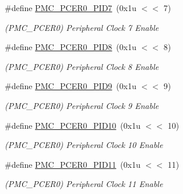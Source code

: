 \begin{DoxyCompactItemize}
\mbox{\label{group__SAMV71__PMC_ga65f9177c03d2f671c8eb80a60592defb}} 
\#define \mbox{\hyperlink{group__SAMV71__PMC_ga65f9177c03d2f671c8eb80a60592defb}{P\+M\+C\+\_\+\+P\+C\+E\+R0\+\_\+\+P\+I\+D7}}~(0x1u $<$$<$ 7)
\begin{DoxyCompactList}\small\item\em (P\+M\+C\+\_\+\+P\+C\+E\+R0) Peripheral Clock 7 Enable \end{DoxyCompactList}\item 
\mbox{\label{group__SAMV71__PMC_ga7cf79cd20d5b5286d828f43bbea5bdb6}} 
\#define \mbox{\hyperlink{group__SAMV71__PMC_ga7cf79cd20d5b5286d828f43bbea5bdb6}{P\+M\+C\+\_\+\+P\+C\+E\+R0\+\_\+\+P\+I\+D8}}~(0x1u $<$$<$ 8)
\begin{DoxyCompactList}\small\item\em (P\+M\+C\+\_\+\+P\+C\+E\+R0) Peripheral Clock 8 Enable \end{DoxyCompactList}\item 
\mbox{\label{group__SAMV71__PMC_gabda1de707ed60eb6cf4989c63f0c834c}} 
\#define \mbox{\hyperlink{group__SAMV71__PMC_gabda1de707ed60eb6cf4989c63f0c834c}{P\+M\+C\+\_\+\+P\+C\+E\+R0\+\_\+\+P\+I\+D9}}~(0x1u $<$$<$ 9)
\begin{DoxyCompactList}\small\item\em (P\+M\+C\+\_\+\+P\+C\+E\+R0) Peripheral Clock 9 Enable \end{DoxyCompactList}\item 
\mbox{\label{group__SAMV71__PMC_gab8555796956459c17ec1dc31e355b6cd}} 
\#define \mbox{\hyperlink{group__SAMV71__PMC_gab8555796956459c17ec1dc31e355b6cd}{P\+M\+C\+\_\+\+P\+C\+E\+R0\+\_\+\+P\+I\+D10}}~(0x1u $<$$<$ 10)
\begin{DoxyCompactList}\small\item\em (P\+M\+C\+\_\+\+P\+C\+E\+R0) Peripheral Clock 10 Enable \end{DoxyCompactList}\item 
\mbox{\label{group__SAMV71__PMC_gab4a377380f7e755be2648d7654a65a63}} 
\#define \mbox{\hyperlink{group__SAMV71__PMC_gab4a377380f7e755be2648d7654a65a63}{P\+M\+C\+\_\+\+P\+C\+E\+R0\+\_\+\+P\+I\+D11}}~(0x1u $<$$<$ 11)
\begin{DoxyCompactList}\small\item\em (P\+M\+C\+\_\+\+P\+C\+E\+R0) Peripheral Clock 11 Enable \end{DoxyCompactList}\item 
$$
\end{DoxyCompactItemize}
